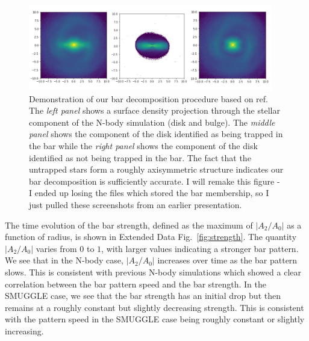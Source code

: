 \documentclass{natureprintstyle}
\begin{document}
\begin{figure}[t!]%
\centering
\includegraphics[width=0.95\textwidth]{fig/fig-bar_decomp.pdf}
\caption{Demonstration of our bar decomposition procedure based on
ref.\cite{2016MNRAS.463.1952P} The \textit{left panel} shows a surface density
projection through the stellar component of the N-body simulation (disk and
bulge). The \textit{middle panel} shows the component of the disk identified
as being trapped in the bar while the \textit{right panel} shows the component
of the disk identified as not being trapped in the bar. The fact that the
untrapped stars form a roughly axisymmetric structure indicates our bar
decomposition is sufficiently accurate. {\color{red} I will remake this figure
- I ended up losing the files which stored the bar membership, so I just
pulled these screenshots from an earlier presentation.}}
\label{fig:decomp}
\end{figure}

The time evolution of the bar strength, defined as the maximum of
$\left|A_2/A_0\right|$ as a function of radius, is shown in Extended Data
Fig.~\ref{fig:strength}. The quantity $\left|A_2/A_0\right|$ varies from $0$
to $1$, with larger values indicating a stronger bar pattern. We see that in
the N-body case, $\left|A_2/A_0\right|$ increases over time as the bar pattern
slows. This is consistent with previous N-body simulations which showed a
clear correlation between the bar pattern speed and the bar
strength.\cite{2003MNRAS.341.1179A} In the SMUGGLE case, we see that the bar
strength has an initial drop but then remains at a roughly constant but
slightly decreasing strength. This is consistent with the pattern speed in the
SMUGGLE case being roughly constant or slightly increasing.
\end{document}
